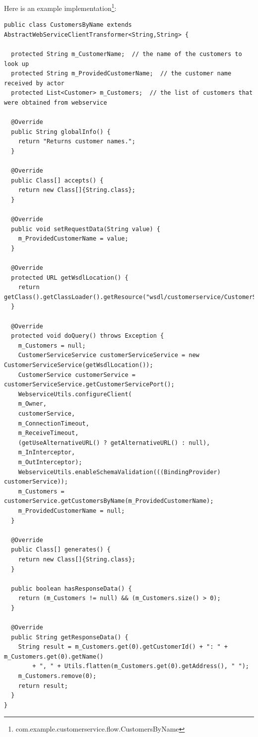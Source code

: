 \documentclass[a4paper]{book}
\begin{document}
Here is an example 
implementation\footnote{com.example.customerservice.flow.CustomersByName}:
{\scriptsize
\begin{verbatim}
public class CustomersByName extends AbstractWebServiceClientTransformer<String,String> {
  
  protected String m_CustomerName;  // the name of the customers to look up
  protected String m_ProvidedCustomerName;  // the customer name received by actor
  protected List<Customer> m_Customers;  // the list of customers that were obtained from webservice

  @Override
  public String globalInfo() {
    return "Returns customer names.";
  }

  @Override
  public Class[] accepts() {
    return new Class[]{String.class};
  }

  @Override
  public void setRequestData(String value) {
    m_ProvidedCustomerName = value;
  }

  @Override
  protected URL getWsdlLocation() {
    return getClass().getClassLoader().getResource("wsdl/customerservice/CustomerService.wsdl");
  }

  @Override
  protected void doQuery() throws Exception {
    m_Customers = null;
    CustomerServiceService customerServiceService = new CustomerServiceService(getWsdlLocation());
    CustomerService customerService = customerServiceService.getCustomerServicePort();
    WebserviceUtils.configureClient(
	m_Owner,
	customerService,
	m_ConnectionTimeout,
	m_ReceiveTimeout,
	(getUseAlternativeURL() ? getAlternativeURL() : null),
	m_InInterceptor,
	m_OutInterceptor);
    WebserviceUtils.enableSchemaValidation(((BindingProvider) customerService));
    m_Customers = customerService.getCustomersByName(m_ProvidedCustomerName);
    m_ProvidedCustomerName = null;
  }

  @Override
  public Class[] generates() {
    return new Class[]{String.class};
  }
  
  public boolean hasResponseData() {
    return (m_Customers != null) && (m_Customers.size() > 0);
  }

  @Override
  public String getResponseData() {
    String result = m_Customers.get(0).getCustomerId() + ": " + m_Customers.get(0).getName() 
        + ", " + Utils.flatten(m_Customers.get(0).getAddress(), " ");
    m_Customers.remove(0);
    return result;
  }
}
\end{verbatim}
}
\end{document}

